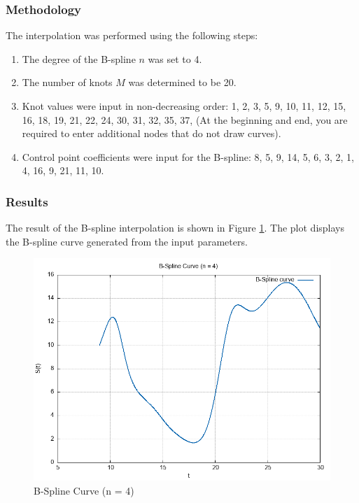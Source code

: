 \documentclass{article}
\begin{document}
\subsubsection{Methodology}
The interpolation was performed using the following steps:
\begin{enumerate}
    \item The degree of the B-spline \( n \) was set to 4.
    \item The number of knots \( M \) was determined to be 20.
    \item Knot values were input in non-decreasing order: 1, 2, 3, 5, 9, 10, 11, 12, 15, 16, 18, 19, 21, 22, 24, 30, 31, 32, 35, 37, (At the beginning and end, you are required to enter additional nodes that do not draw curves).
    \item Control point coefficients were input for the B-spline: 8, 5, 9, 14, 5, 6, 3, 2, 1, 4, 16, 9, 21, 11, 10.
\end{enumerate}

\subsubsection{Results}
The result of the B-spline interpolation is shown in Figure \ref{fig:bspline}. The plot displays the B-spline curve generated from the input parameters.

\begin{figure}[H]
    \centering
    \includegraphics[width=\textwidth]{../figure/n_degree_BSpline_plot.png}
    \caption{B-Spline Curve (n = 4)}
    \label{fig:bspline}
\end{figure}
\end{document}
